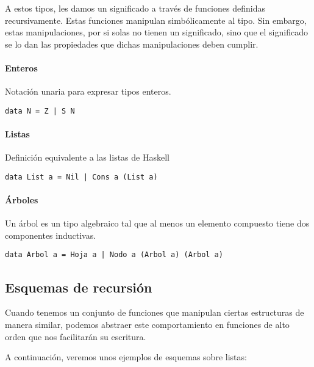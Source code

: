 A estos tipos, les damos un significado a través de funciones definidas recursivamente. Estas funciones manipulan simbólicamente al tipo. Sin embargo, estas manipulaciones, por si solas no tienen un significado, sino que el significado se lo dan las propiedades que dichas manipulaciones deben cumplir.

\paragraph{Enteros} Notación unaria para expresar tipos enteros.
\begin{centrado}
	\begin{verbatim}
data N = Z | S N
	\end{verbatim}
\end{centrado}

\paragraph{Listas} Definición equivalente a las listas de Haskell
\begin{centrado}
	\begin{verbatim}
data List a = Nil | Cons a (List a)
	\end{verbatim}
\end{centrado}

\paragraph{Árboles}
Un árbol es un tipo algebraico tal que al menos un elemento compuesto tiene dos componentes inductivas.

\begin{centrado}
	\begin{verbatim}
data Arbol a = Hoja a | Nodo a (Arbol a) (Arbol a)
	\end{verbatim}
\end{centrado}

\subsection{Esquemas de recursión} \label{sec:funcional.sub:esquemas_recursion}
Cuando tenemos un conjunto de funciones que manipulan ciertas estructuras de manera similar, podemos abstraer este comportamiento en funciones de alto orden que nos facilitarán su escritura.

A continuación, veremos unos ejemplos de esquemas sobre listas: 
